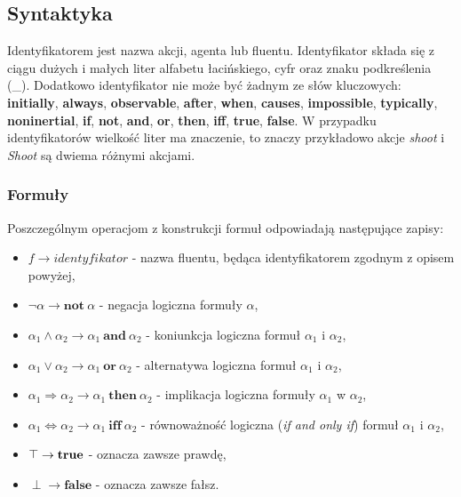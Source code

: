 \documentclass[11pt,a4paper]{article}
\def\tang{\ThisStyle{\abovebaseline[0pt]{\scalebox{-1}{$\SavedStyle\perp$}}}}
\begin{document}
    \subsection{Syntaktyka}
    
    Identyfikatorem jest nazwa akcji, agenta lub fluentu. Identyfikator składa się z ciągu dużych i małych liter alfabetu łacińskiego, cyfr oraz znaku podkreślenia (\_). Dodatkowo identyfikator nie może być żadnym ze słów kluczowych: \textbf{initially}, \textbf{always}, \textbf{observable}, \textbf{after}, \textbf{when}, \textbf{causes}, \textbf{impossible}, \textbf{typically}, \textbf{noninertial}, \textbf{if}, \textbf{not}, \textbf{and}, \textbf{or}, \textbf{then}, \textbf{iff}, \textbf{true}, \textbf{false}. W przypadku identyfikatorów wielkość liter ma znaczenie, to znaczy przykładowo akcje \textit{shoot} i \textit{Shoot} są dwiema różnymi akcjami.

    \subsubsection{Formuły}
    
    Poszczególnym operacjom z konstrukcji formuł odpowiadają następujące zapisy:
    \begin{itemize}
        \item $f \rightarrow identyfikator$ - nazwa fluentu, będąca identyfikatorem zgodnym z opisem powyżej,
        \item $\neg \alpha \rightarrow \mathbf{not}~\alpha$ - negacja logiczna formuły $\alpha$,
        \item $\alpha_1 \wedge \alpha_2 \rightarrow \alpha_1~\mathbf{and}~\alpha_2$ - koniunkcja logiczna formuł $\alpha_1$ i $\alpha_2$,
        \item $\alpha_1 \vee \alpha_2 \rightarrow \alpha_1~\mathbf{or}~\alpha_2$ - alternatywa logiczna formuł $\alpha_1$ i $\alpha_2$,
        \item $\alpha_1 \Rightarrow \alpha_2 \rightarrow \alpha_1~\mathbf{then}~\alpha_2$ - implikacja logiczna formuły $\alpha_1$ w $\alpha_2$,
        \item $\alpha_1 \Leftrightarrow \alpha_2 \rightarrow \alpha_1~\mathbf{iff}~\alpha_2$ - równoważność logiczna (\textit{if and only if}) formuł $\alpha_1$ i $\alpha_2$,
        \item $\tang \rightarrow \mathbf{true}$ - oznacza zawsze prawdę,
        \item $\perp \rightarrow \mathbf{false}$ - oznacza zawsze fałsz.
    \end{itemize}
    
\end{document}
